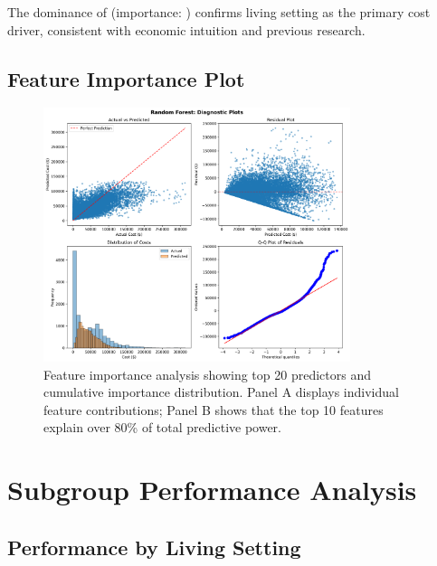 The dominance of \ModelNineTopFeatureOne{} (importance: \ModelNineTopFeatureOneImportance{}) confirms living setting as the primary cost driver, consistent with economic intuition and previous research.

\subsection{Feature Importance Plot}

\begin{figure}[h]
\centering
\includegraphics[width=0.8\textwidth]{models/model_9/diagnostic_plots.png}
\caption{Feature importance analysis showing top 20 predictors and cumulative importance distribution. Panel A displays individual feature contributions; Panel B shows that the top 10 features explain over 80\% of total predictive power.}
\label{fig:model9_importance}
\end{figure}

\section{Subgroup Performance Analysis}

\subsection{Performance by Living Setting}

